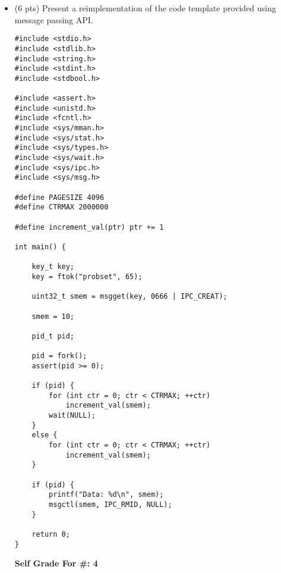 \documentclass[conference]{IEEEtran}
\begin{document}
\begin{itemize}
\item (6 pts) Present a reimplementation of the code template provided using message passing
API.
	\begin{lstlisting}
#include <stdio.h>
#include <stdlib.h>
#include <string.h>
#include <stdint.h>
#include <stdbool.h>

#include <assert.h>
#include <unistd.h>
#include <fcntl.h>
#include <sys/mman.h>
#include <sys/stat.h>
#include <sys/types.h>
#include <sys/wait.h>
#include <sys/ipc.h> 
#include <sys/msg.h> 

#define PAGESIZE 4096
#define CTRMAX 2000000

#define increment_val(ptr) ptr += 1

int main() {
	
	key_t key;
	key = ftok("probset", 65);
	
	uint32_t smem = msgget(key, 0666 | IPC_CREAT); 
	
	smem = 10;
	
	pid_t pid;
	
	pid = fork();
	assert(pid >= 0);
	
	if (pid) {
		for (int ctr = 0; ctr < CTRMAX; ++ctr)
			increment_val(smem);
		wait(NULL);
	} 
	else {
		for (int ctr = 0; ctr < CTRMAX; ++ctr)
			increment_val(smem);
	}
	
	if (pid) {
		printf("Data: %d\n", smem);
		msgctl(smem, IPC_RMID, NULL);
	}
	
	return 0;
}
	\end{lstlisting}
		\begin{center}
			\textbf{Self Grade For \#: 4}
		\end{center}
\end{itemize}

\end{document}

